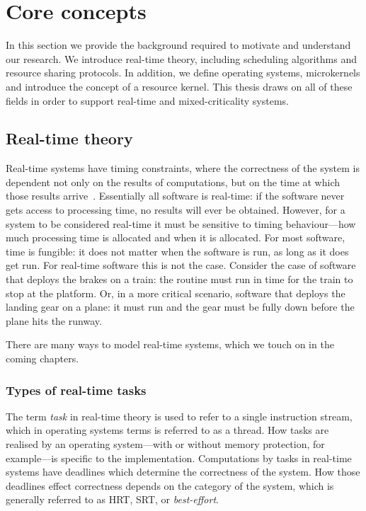 




\chapter{Core concepts}
\label{chap:background}

In this section we provide the background required to motivate and understand our research.
We introduce real-time theory, including scheduling algorithms and resource sharing protocols.
In addition, we define operating systems, microkernels and introduce the concept of a resource kernel.
This thesis draws on all of these fields in order to support real-time and mixed-criticality systems.

\section{Real-time theory}
\label{sec:real-time-theory}

Real-time systems have timing constraints, where the correctness of the system is dependent not only
on the results of computations, but on the time at which those results arrive~\citep{Stankovic_88}.
Essentially all software is real-time: if the software never gets access to processing time, no
results will ever be obtained.  However, for a system to be considered real-time it must be
sensitive to timing behaviour---how much processing time is allocated and when it is allocated. For
most software, time is fungible: it does not matter when the software is run, as long as it does get
run. For real-time software this is not the case.  Consider the case of software that deploys the
brakes on a train: the routine must run in time for the train to stop at the platform. Or, in a more
critical scenario, software that deploys the landing gear on a plane: it must run and the gear must
be fully down before the plane hits the runway.

There are many ways to model real-time systems, which we touch on in the coming chapters. 

\subsection{Types of real-time tasks}

The term \emph{task} in real-time theory is used to refer to a single instruction stream, which in 
operating systems terms is referred to as a thread. How tasks
are realised by an operating system---with or without memory protection, for example---is specific to the
implementation.  Computations by tasks in real-time systems have deadlines which determine the
correctness of the system. How those deadlines effect correctness depends on the category of the
system, which is generally referred to as \gls{HRT}, \gls{SRT}, or \emph{best-effort}.

